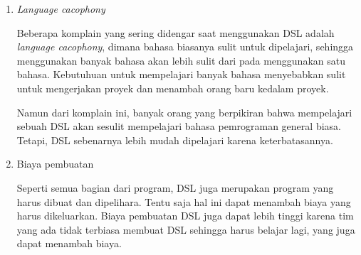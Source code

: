 \begin{enumerate}
    \item \emph{Language cacophony}
    
    Beberapa komplain yang sering didengar saat menggunakan DSL adalah \emph{language cacophony},
    dimana bahasa biasanya sulit untuk dipelajari, sehingga menggunakan banyak bahasa akan lebih
    sulit dari pada menggunakan satu bahasa. Kebutuhuan untuk mempelajari banyak bahasa menyebabkan
    sulit untuk mengerjakan proyek dan menambah orang baru kedalam proyek.

    Namun dari komplain ini, banyak orang yang berpikiran bahwa mempelajari sebuah DSL akan sesulit
    mempelajari bahasa pemrograman general biasa. Tetapi, DSL sebenarnya lebih mudah dipelajari
    karena keterbatasannya.

    \item Biaya pembuatan
    
    Seperti semua bagian dari program, DSL juga merupakan program yang harus dibuat dan dipelihara.
    Tentu saja hal ini dapat menambah biaya yang harus dikeluarkan. Biaya pembuatan DSL juga dapat
    lebih tinggi karena tim yang ada tidak terbiasa membuat DSL sehingga harus belajar lagi, yang
    juga dapat menambah biaya.

\end{enumerate}

